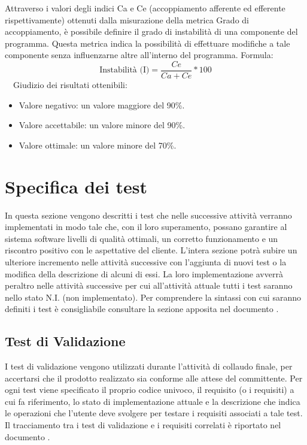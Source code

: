 \documentclass[a4paper, titlepage]{article}
\begin{document}
Attraverso i valori degli indici Ca e Ce (accoppiamento afferente ed efferente rispettivamente) ottenuti dalla misurazione della metrica Grado di accoppiamento, è possibile definire il grado di instabilità di una componente del programma. Questa metrica indica la possibilità di effettuare modifiche a tale componente senza influenzarne altre all’interno del programma.
\newline Formula:
\begin{displaymath}
\mbox{Instabilità (I)}=\frac{Ce}{Ca+Ce}*100
\end{displaymath}
\
\
\newline Giudizio dei risultati ottenibili:
\begin{itemize}
\item Valore negativo: un valore maggiore del 90\%.
\item Valore accettabile: un valore minore del 90\%.
\item Valore ottimale: un valore minore del 70\%.
\end{itemize}

 
\newpage
\section{Specifica dei test}
In questa sezione vengono descritti i test che nelle successive attività verranno implementati in modo tale che, con il loro superamento, possano garantire al sistema software livelli di qualità ottimali, un corretto funzionamento e un riscontro positivo con le aspettative del cliente.
\newline L'intera sezione potrà subire un ulteriore incremento nelle attività successive con l'aggiunta di nuovi test o la modifica della descrizione di alcuni di essi. La loro implementazione avverrà peraltro nelle attività successive per cui all'attività attuale tutti i test saranno nello stato N.I. (non implementato).
\newline Per comprendere la sintassi con cui saranno definiti i test è consigliabile consultare la sezione apposita nel documento \doc{Norme di Progetto}.

\subsection{Test di Validazione}
I test di validazione vengono utilizzati durante l'attività di collaudo finale, per accertarsi che il prodotto realizzato sia conforme alle attese del committente.
\newline Per ogni test viene specificato il proprio codice univoco, il requisito (o i requisiti) a cui fa riferimento, lo stato di implementazione attuale e la descrizione che indica le operazioni che l'utente deve svolgere per testare i requisiti associati a tale test. 
\newline Il tracciamento tra i test di validazione e i requisiti correlati è riportato nel documento \doc{Analisi dei Requisiti}.
\end{document}
